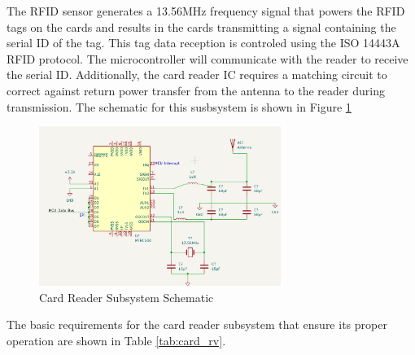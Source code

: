 \documentclass[12pt]{article}
\begin{document}
The RFID sensor generates a 13.56MHz frequency signal that powers the RFID tags on the cards and results in the cards transmitting a signal containing the serial ID of the tag. This tag data reception is controled using the ISO 14443A RFID protocol. The microcontroller will communicate with the reader to receive the serial ID. Additionally, the card reader IC requires a matching circuit to correct against return power transfer from the antenna to the reader during transmission. The schematic for this susbsystem is shown in Figure \ref{fig:card_schem}

\begin{figure}[!h]
	\centering
	\includegraphics[width=0.7\textwidth]{unknown.png}
	\caption{Card Reader Subsystem Schematic}
	\label{fig:card_schem}
\end{figure}

The basic requirements for the card reader subsystem that ensure its proper operation are shown in Table \ref{tab:card_rv}.
\end{document}
